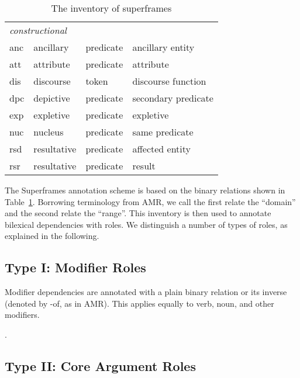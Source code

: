 \documentclass[a4paper]{article}
\begin{document}
\begin{table}
\begin{tabular}{llll}
        \midrule
        \multicolumn{4}{l}{\emph{constructional}} \\
        anc & ancillary & predicate & ancillary entity \\
        att & attribute & predicate & attribute \\
        dis & discourse & token & discourse function \\
        dpc & depictive & predicate & secondary predicate\\
        exp & expletive & predicate & expletive \\
        nuc & nucleus & predicate & same predicate \\
        rsd & resultative & predicate & affected entity \\
        rsr & resultative & predicate & result \\ 
        \bottomrule
    \end{tabular}
    \caption{The inventory of superframes}
    \label{tab:inventory}
\end{table}

The Superframes annotation scheme is based on the binary relations shown in Table~\ref{tab:inventory}. Borrowing terminology from AMR, we call the first relate the ``domain'' and the second relate the ``range''. This inventory is then used to annotate bilexical dependencies with roles. We distinguish a number of types of roles, as explained in the following.

\subsection{Type I: Modifier Roles}

Modifier dependencies are annotated with a plain binary relation or its inverse (denoted by \textsf{-of}, as in AMR). This applies equally to verb, noun, and other modifiers.

\ex. 

\subsection{Type II: Core Argument Roles}
\end{document}
